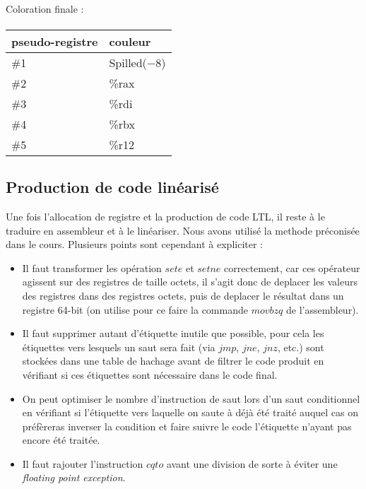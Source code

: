 \paragraph{}
Coloration finale :
\paragraph{}
\begin{tabular}{l|l}
  pseudo-registre & couleur \\
  \hline
  \#1 & Spilled($-8$) \\
\#2 & \%rax \\
\#3 & \%rdi \\
\#4 & \%rbx \\
\#5 & \%r12 \\
\end{tabular}
\subsection{Production de code lin\'earis\'e}

Une fois l'allocation de registre et la production de code LTL, il reste \`a le traduire en assembleur et \`a le lin\'eariser. Nous avons utilis\'e la methode pr\'econis\'ee dans le cours. Plusieurs points sont cependant \`a expliciter :

\begin{itemize}

\item Il faut transformer les op\'eration $sete$ et $setne$ correctement, car ces op\'erateur agissent sur des registres de taille octets, il s'agit donc de deplacer les valeurs des registres dans des registres octets, puis de deplacer le r\'esultat dans un registre 64-bit (on utilise pour ce faire la commande $movbzq$ de l'assembleur).

\item Il faut supprimer autant d'\'etiquette inutile que possible, pour cela les \'etiquettes vers lesquels un saut sera fait (via $jmp$, $jne$, $jnz$, etc.) sont stock\'ees dans une table de hachage avant de filtrer le code produit en v\'erifiant si ces \'etiquettes sont n\'ecessaire dans le code final.

\item On peut optimiser le nombre d'instruction de saut lors d'un saut conditionnel en v\'erifiant si l'\'etiquette vers laquelle on saute \`a d\'ej\`a \'et\'e trait\'e auquel cas on pr\'ef\`ereras inverser la condition et faire suivre le code l'\'etiquette n'ayant pas encore \'et\'e trait\'ee.

\item Il faut rajouter l'instruction $cqto$ avant une division de sorte \`a \'eviter une \emph{floating point exception}.
\end{itemize}
